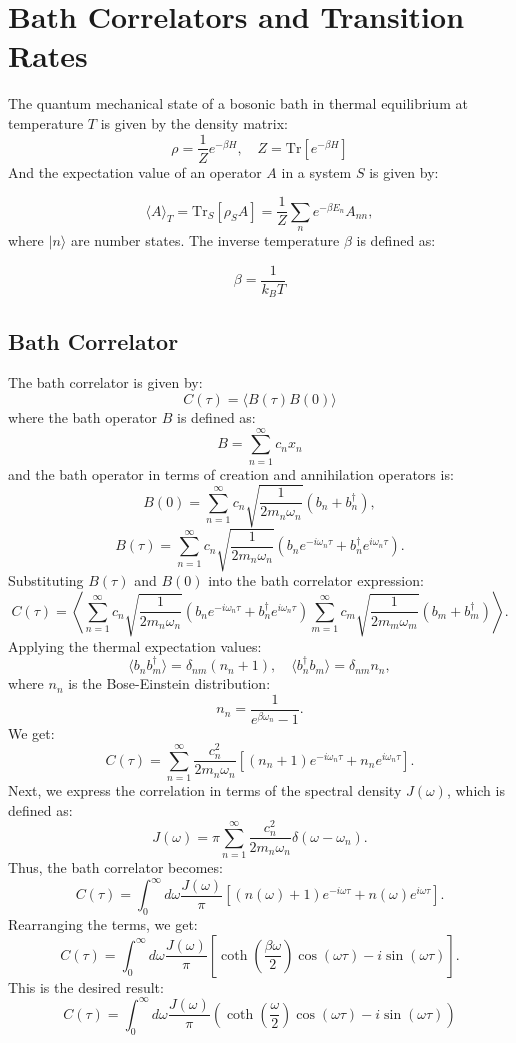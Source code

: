 \newpage
\section{Bath Correlators and Transition Rates}
The quantum mechanical state of a bosonic bath in thermal equilibrium at temperature \( T \) is given by the density matrix:
\[
\rho = \frac{1}{Z} e^{-\beta H}, \quad Z = \text{Tr}\left[e^{-\beta H}\right]
\]
And the expectation value of an operator \( A \) in a system \( S \) is given by:

$$
\langle A \rangle_T = \text{Tr}_S[\rho_S A] = \frac{1}{Z} \sum_n e^{-\beta E_n} A_{nn},
$$
where \(|n\rangle\) are number states. 
The inverse temperature \(\beta\) is defined as:

\[
\beta = \frac{1}{k_B T}
\]

\subsection{Bath Correlator}

The bath correlator is given by:
\[
C(\tau) = \langle B(\tau) B(0) \rangle
\]
where the bath operator \( B \) is defined as:
\[
B = \sum_{n=1}^{\infty} c_n x_n
\]
and the bath operator in terms of creation and annihilation operators is:
\[
B(0) = \sum_{n=1}^{\infty} c_n \sqrt{\frac{1}{2 m_n \omega_n}} (b_n + b_n^\dagger),
\]
\[
B(\tau) = \sum_{n=1}^{\infty} c_n \sqrt{\frac{1}{2 m_n \omega_n}} \left( b_n e^{-i \omega_n \tau} + b_n^\dagger e^{i \omega_n \tau} \right).
\]
Substituting \( B(\tau) \) and \( B(0) \) into the bath correlator expression:
\[
C(\tau) = \left\langle \sum_{n=1}^{\infty} c_n \sqrt{\frac{1}{2 m_n \omega_n}} (b_n e^{-i \omega_n \tau} + b_n^\dagger e^{i \omega_n \tau}) \sum_{m=1}^{\infty} c_m \sqrt{\frac{1}{2 m_m \omega_m}} (b_m + b_m^\dagger) \right\rangle.
\]
Applying the thermal expectation values:
\[
\langle b_n b_m^\dagger \rangle = \delta_{nm} (n_n + 1), \quad \langle b_n^\dagger b_m \rangle = \delta_{nm} n_n,
\]
where \( n_n \) is the Bose-Einstein distribution:
\[
n_n = \frac{1}{e^{\beta \omega_n} - 1}.
\]
We get:
\[
C(\tau) = \sum_{n=1}^{\infty} \frac{c_n^2}{2 m_n \omega_n} \left[ (n_n + 1) e^{-i \omega_n \tau} + n_n e^{i \omega_n \tau} \right].
\]
Next, we express the correlation in terms of the spectral density \( J(\omega) \), which is defined as:
\[
J(\omega) = \pi \sum_{n=1}^{\infty} \frac{c_n^2}{2 m_n \omega_n} \delta(\omega - \omega_n).
\]
Thus, the bath correlator becomes:
\[
C(\tau) = \int_0^\infty d\omega \frac{J(\omega)}{\pi} \left[ (n(\omega) + 1) e^{-i \omega \tau} + n(\omega) e^{i \omega \tau} \right].
\]
Rearranging the terms, we get:
\[
C(\tau) = \int_0^\infty d\omega \frac{J(\omega)}{\pi} \left[ \coth\left( \frac{\beta \omega}{2} \right) \cos(\omega \tau) - i \sin(\omega \tau) \right].
\]
This is the desired result:
\[
C(\tau) = \int_0^\infty d\omega \frac{J(\omega)}{\pi} \left( \coth\left( \frac{\omega}{2} \right) \cos(\omega \tau) - i \sin(\omega \tau) \right)
\]




